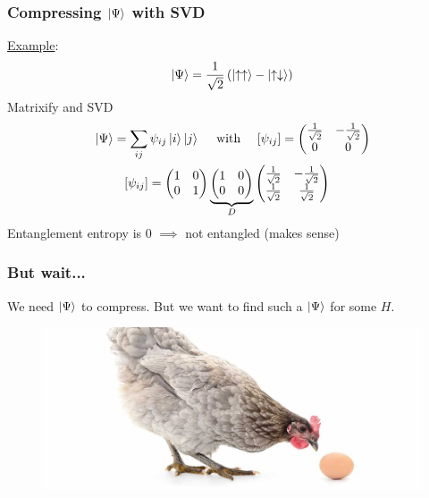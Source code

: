 \documentclass{beamer}
\theoremstyle{definition}
\newcommand{\lp}{\left(}
\newcommand{\rp}{\right)}
\newcommand{\f}[2]{\frac{#1}{#2}}
\begin{document}
\begin{frame}
	\frametitle{Compressing $\ket{\Psi}$ with SVD}
	
	\underline{Example}:  
	\begin{align*}
		\ket{\Psi} = \f{1}{\sqrt{2}}\lp \ket{\uparrow\uparrow} - \ket{\uparrow\downarrow} \rp
	\end{align*}
	Matrixify and SVD
	\begin{align*}
		&\ket{\Psi} = \sum_{ij}\psi_{ij}\ket{i}\ket{j} \quad \text{ with } \quad   [\psi_{ij}] = \begin{pmatrix}
			\f{1}{\sqrt{2}} & -\f{1}{\sqrt{2}} \\ 0 & 0
		\end{pmatrix}\\
		&\quad\quad \,\,\,[\psi_{ij}] = \begin{pmatrix}
			1 & 0 \\ 0 & 1
		\end{pmatrix}
		\underbrace{\begin{pmatrix}
				1 & 0 \\ 0 & 0 
		\end{pmatrix}}_D
		\begin{pmatrix}
			\f{1}{\sqrt{2}} & -\f{1}{\sqrt{2}} \\ 	\f{1}{\sqrt{2}} & \f{1}{\sqrt{2}}
		\end{pmatrix}
	\end{align*}
	Entanglement entropy is 0 $\implies$ not entangled (makes sense)
\end{frame}



\begin{frame}
	\frametitle{But wait...}
		
	We need $\ket{\Psi}$ to compress. But we want to find such a $\ket{\Psi}$ for some $H$. \\
	
	\vspace{15pt}
	
	\begin{figure}[!htb]
		\centering
		\includegraphics[scale=0.2]{chickenegg.jpg}
	\end{figure}
	
	\vspace{8pt}

\end{frame}
\end{document}
